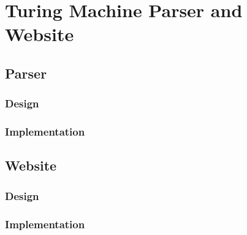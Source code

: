 \chapter{Turing Machine Parser and Website}

\section{Parser}
\subsection{Design}

\subsection{Implementation}


\section{Website}
\subsection{Design}

\subsection{Implementation}